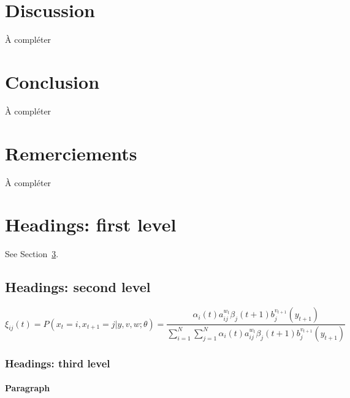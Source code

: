 \documentclass{article}
\begin{document}
  \section{Discussion}
  \label{sec:discussion}
  À compléter


  \section{Conclusion}
  À compléter

  \section*{Remerciements}
  À compléter

  
  




  \section{Headings: first level}
  \label{sec:headings}

  \lipsum[4] See Section~\ref{sec:headings}.

  \subsection{Headings: second level}
  \label{subsec:headings:second-level}
  \lipsum[5]
  \begin{equation}
    \xi _{ij}(t)=P(x_{t}=i,x_{t+1}=j|y,v,w;\theta)= {\frac {\alpha _{i}(t)a^{w_t}_{ij}\beta _{j}(t+1)b^{v_{t+1}}_{j}(y_{t+1})}{\sum _{i=1}^{N} \sum _{j=1}^{N} \alpha
    _{i}(t)a^{w_t}_{ij}\beta _{j}(t+1)b^{v_{t+1}}_{j}(y_{t+1})}}\label{eq:eq1}
  \end{equation}

  \subsubsection{Headings: third level}
  \lipsum[6]

  \paragraph{Paragraph}
  \lipsum[7]
\end{document}
